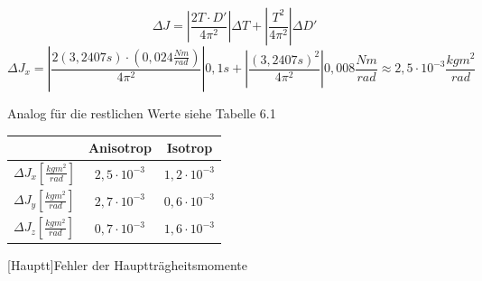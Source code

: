 \documentclass[12pt,a4paper,]{scrreprt}
\begin{document}
    \begin{equation}
    \Delta J = 
    |\frac{2 T \cdot D'}{4 \pi^2}| \Delta T +
    |\frac{T^2}{4 \pi^2}| \Delta D'
     \end{equation}
    \begin{equation}
    \Delta J_x = 
    |\frac{2 (3,2407s) \cdot (0,024 \frac{Nm}{rad})}{4 \pi^2}| 0,1s +
    |\frac{(3,2407s)^2}{4 \pi^2}| 0,008\frac{Nm}{rad} \approx 2,5 \cdot 10^{-3} \frac{kgm^2}{rad}
     \end{equation}
   
   Analog für die restlichen Werte siehe Tabelle 6.1 \\
   
   \begin{center}
   \begin{tabular}{l|c|c}
			&	Anisotrop  & Isotrop    \\ \hline \hline
		$\Delta J_x [\frac{kgm^2}{rad}]$ & $2,5 \cdot 10^{-3}$ & $1,2 \cdot 10^{-3}$ \\
		$\Delta J_y [\frac{kgm^2}{rad}]$ & $2,7 \cdot 10^{-3}$ & $0,6 \cdot 10^{-3}$ \\
		$\Delta J_z [\frac{kgm^2}{rad}]$ & $0,7 \cdot 10^{-3}$ & $1,6 \cdot 10^{-3}$
	\end{tabular}
    [Hauptt]{Fehler der Hauptträgheitsmomente}
   	\end{center}
   
   \pagebreak

\end{document}
